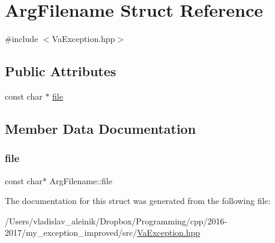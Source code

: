\hypertarget{struct_arg_filename}{}\section{Arg\+Filename Struct Reference}
\label{struct_arg_filename}


{\ttfamily \#include $<$Va\+Exception.\+hpp$>$}

\subsection*{Public Attributes}
\begin{DoxyCompactItemize}
\item 
const char $\ast$ \hyperlink{struct_arg_filename_af4636b161aebc2e7861fc28503a32282}{file}
\end{DoxyCompactItemize}


\subsection{Member Data Documentation}
\mbox{\label{struct_arg_filename_af4636b161aebc2e7861fc28503a32282}} 
\subsubsection{\texorpdfstring{file}{file}}
{\footnotesize\ttfamily const char$\ast$ Arg\+Filename\+::file}



The documentation for this struct was generated from the following file\+:\begin{DoxyCompactItemize}
\item 
/\+Users/vladislav\+\_\+aleinik/\+Dropbox/\+Programming/cpp/2016-\/2017/my\+\_\+exception\+\_\+improved/src/\hyperlink{_va_exception_8hpp}{Va\+Exception.\+hpp}\end{DoxyCompactItemize}
